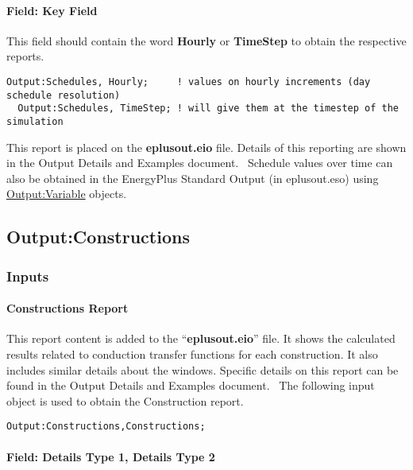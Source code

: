\paragraph{Field: Key Field}\label{field-key-field-1}

This field should contain the word \textbf{Hourly} or \textbf{TimeStep} to obtain the respective reports.

\begin{lstlisting}
Output:Schedules, Hourly;     ! values on hourly increments (day schedule resolution)
  Output:Schedules, TimeStep; ! will give them at the timestep of the simulation
\end{lstlisting}

This report is placed on the \textbf{eplusout.eio} file. Details of this reporting are shown in the Output Details and Examples document.~ Schedule values over time can also be obtained in the EnergyPlus Standard Output (in eplusout.eso) using \hyperref[outputvariable]{Output:Variable} objects.

\subsection{Output:Constructions}\label{outputconstructions}

\subsubsection{Inputs}\label{inputs-3-030}

\paragraph{Constructions Report}\label{constructions-report}

This report content is added to the ``\textbf{eplusout.eio}'' file. It shows the calculated results related to conduction transfer functions for each construction. It also includes similar details about the windows. Specific details on this report can be found in the Output Details and Examples document.~ The following input object is used to obtain the Construction report.

\begin{lstlisting}
Output:Constructions,Constructions;
\end{lstlisting}

\paragraph{Field: Details Type 1, Details Type 2}\label{field-details-type-1-details-type-2}

